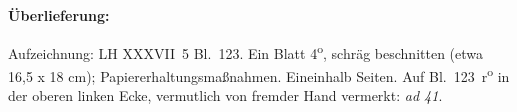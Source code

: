 %
%
%
%
%
\frenchspacing%
%
\begin{ledgroupsized}[r]{120mm}%
\footnotesize%
\pstart%
\noindent\textbf{Überlieferung:}%
\pend%
\end{ledgroupsized}%
\begin{ledgroupsized}[r]{114mm}%
\footnotesize%
\pstart%
\parindent -6mm%
%
Aufzeichnung:
LH XXXVII~5 Bl.~123.
Ein Blatt 4\textsuperscript{o}, schräg beschnitten (etwa 16,5 x 18 cm);
Papiererhaltungsmaßnahmen.
Eineinhalb Seiten.
Auf Bl.~123~r\textsuperscript{o} in der oberen linken Ecke, vermutlich von fremder Hand vermerkt: \textit{ad 41}.
\pend%
\end{ledgroupsized}%
%
\vspace*{5mm}%
